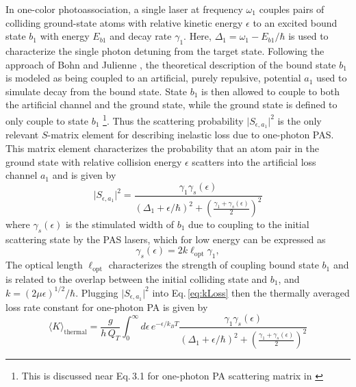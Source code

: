 In one-color photoassociation, a single laser at frequency $\omega_1$ couples pairs of colliding ground-state atoms with relative kinetic energy $\epsilon$ to an excited bound state $b_1$ with energy $E_{b1}$ and decay rate $\gamma_1$.
Here, $\Delta_1 = \omega_1 - E_{b1}/\hbar$ is used to characterize the single photon detuning from the target state.
Following the approach of Bohn and Julienne \cite{Bohn1999}, the theoretical description of the bound state $b_1$ is modeled as being coupled to an artificial, purely repulsive, potential $a_1$ used to simulate decay from the bound state.
State $b_1$ is then allowed to couple to both the artificial channel and the ground state, while the ground state is defined to only couple to state $b_1$ \footnote{This is discussed near Eq.\,3.1 for one-photon PA scattering matrix in \cite{Bohn1999}}.
Thus the scattering probability $\vert S_{\epsilon, a_1} \vert^2$ is the only relevant $S$-matrix element for describing inelastic loss due to one-photon PAS.
This matrix element characterizes the probability that an atom pair in the ground state with relative collision energy $\epsilon$ scatters into the artificial loss channel $a_1$ and is given by
\begin{equation}
	\vert  S_{\epsilon, a_1} \vert^2 = \frac{\gamma_1 \gamma_s(\epsilon)}{(\Delta_1 + \epsilon/ \hbar)^2 + \left( \frac{\gamma_1 + \gamma_s(\epsilon)}{2} \right)^2}
\end{equation}
where ${\gamma}_{s}(\epsilon)$ is the stimulated width of $b_1$ due to coupling to the initial scattering state by the PAS lasers, which for low energy can be expressed as \cite{ctj06,Borkowski2014a,Pachomov2017,Pachomow2017a}
\begin{equation}\label{3equationstimulatedwidth}
	{\gamma}_{s}(\epsilon) = 2 k \ell_{\text{opt}} \gamma_1,
\end{equation}
The optical length $\ell_{\text{opt}}$ characterizes the strength of coupling bound state $b_1$ and is related to the overlap between the initial colliding state and $b_1$, and $k=(2\mu \epsilon)^{1/2}/\hbar$.
Plugging $\vert S_{\epsilon, a_1} \vert^2$ into Eq.\,\ref{eq:kLoss} then the thermally averaged loss rate constant for one-photon PA is given by
\begin{equation} \label{eq:onePhotonK}
	\langle K \rangle_\text{thermal} = \frac{g}{h\,Q_{T}} \int_{0}^{\infty} d\epsilon \,e^{-\epsilon/k_{B}T} \frac{\gamma_1 \gamma_s(\epsilon)}{(\Delta_1 + \epsilon/ \hbar)^2 + \left( \frac{\gamma_1 + \gamma_s(\epsilon)}{2} \right)^2} 
\end{equation}

